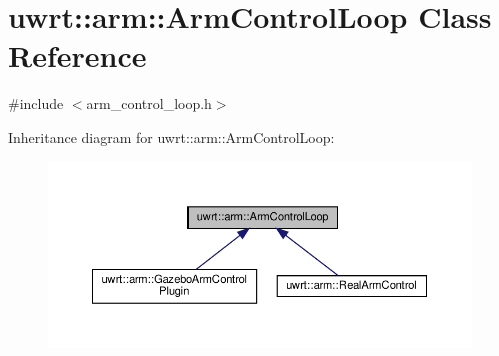 \hypertarget{classuwrt_1_1arm_1_1_arm_control_loop}{}\section{uwrt\+:\+:arm\+:\+:Arm\+Control\+Loop Class Reference}
\label{classuwrt_1_1arm_1_1_arm_control_loop}


{\ttfamily \#include $<$arm\+\_\+control\+\_\+loop.\+h$>$}



Inheritance diagram for uwrt\+:\+:arm\+:\+:Arm\+Control\+Loop\+:
\nopagebreak
\begin{figure}[H]
\begin{center}
\leavevmode
\includegraphics[width=350pt]{classuwrt_1_1arm_1_1_arm_control_loop__inherit__graph}
\end{center}
\end{figure}
